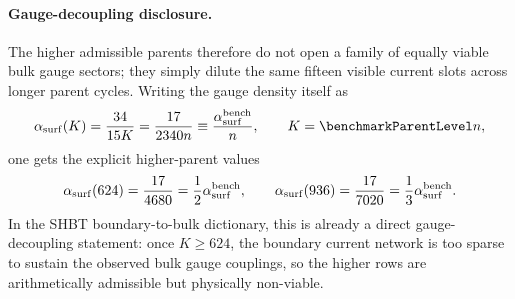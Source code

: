 \documentclass[11pt]{article}
\begin{document}
\paragraph*{Gauge-decoupling disclosure.}
The higher admissible parents therefore do not open a family of equally viable
bulk gauge sectors; they simply dilute the same fifteen visible current slots
across longer parent cycles. Writing the gauge density itself as
\begin{equation}
 \alpha_{\rm surf}(K)
 =
 \frac{34}{15K}
 =
 \frac{17}{2340n}
 \equiv
 \frac{\alpha_{\rm surf}^{\rm bench}}{n},
 \qquad
 K=\benchmarkParentLevel n,
\end{equation}
one gets the explicit higher-parent values
\begin{equation}
 \alpha_{\rm surf}(624)
 =
 \frac{17}{4680}
 =
 \frac{1}{2}\alpha_{\rm surf}^{\rm bench},
 \qquad
 \alpha_{\rm surf}(936)
 =
 \frac{17}{7020}
 =
 \frac{1}{3}\alpha_{\rm surf}^{\rm bench}.
\end{equation}
In the SHBT boundary-to-bulk dictionary, this is already a direct
gauge-decoupling statement: once $K\ge624$, the boundary current network is too
sparse to sustain the observed bulk gauge couplings, so the higher rows are
arithmetically admissible but physically non-viable.
\end{document}
